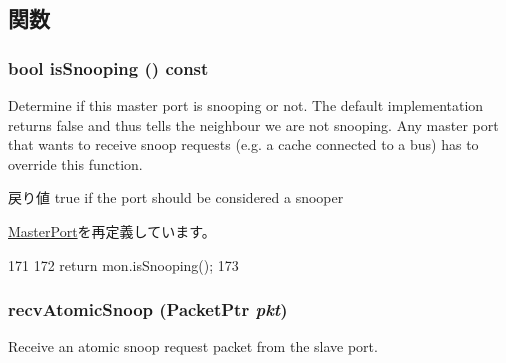 \subsection{関数}
\hypertarget{classCommMonitor_1_1MonitorMasterPort_a5ce11b7a254d3cb756d94568f7cbc25d}{
\subsubsection[{isSnooping}]{\setlength{\rightskip}{0pt plus 5cm}bool isSnooping () const}}
\label{classCommMonitor_1_1MonitorMasterPort_a5ce11b7a254d3cb756d94568f7cbc25d}
Determine if this master port is snooping or not. The default implementation returns false and thus tells the neighbour we are not snooping. Any master port that wants to receive snoop requests (e.g. a cache connected to a bus) has to override this function.

\begin{DoxyReturn}{戻り値}
true if the port should be considered a snooper 
\end{DoxyReturn}


\hyperlink{classMasterPort_a32602a6a3c3d66a639455036d6c08dd6}{MasterPort}を再定義しています。


\begin{DoxyCode}
171         {
172             return mon.isSnooping();
173         }
\end{DoxyCode}
\hypertarget{classCommMonitor_1_1MonitorMasterPort_a886d584c81ee4e398ff8069907f6e1a5}{
\subsubsection[{recvAtomicSnoop}]{ recvAtomicSnoop ({\bf PacketPtr} {\em pkt})}}
\label{classCommMonitor_1_1MonitorMasterPort_a886d584c81ee4e398ff8069907f6e1a5}
Receive an atomic snoop request packet from the slave port. 

